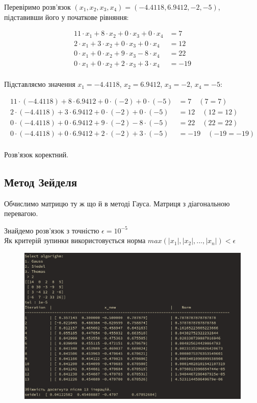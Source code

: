 \documentclass[a4paper, 12pt]{article}
\begin{document}
Перевіримо розв'язок \((x_1, x_2, x_3, x_4) = (-4.4118, 6.9412, -2, -5)\), підставивши його у початкове рівняння:

\[
\begin{aligned}
    11 \cdot x_1 + 8 \cdot x_2 + 0 \cdot x_3 + 0 \cdot x_4 &= 7 \\
    2 \cdot x_1 + 3 \cdot x_2 + 0 \cdot x_3 + 0 \cdot x_4 &= 12 \\
    0 \cdot x_1 + 0 \cdot x_2 + 9 \cdot x_3 - 8 \cdot x_4 &= 22 \\
    0 \cdot x_1 + 0 \cdot x_2 + 2 \cdot x_3 + 3 \cdot x_4 &= -19 \\
\end{aligned}
\]

Підставляємо значення \(x_1 = -4.4118\), \(x_2 = 6.9412\), \(x_3 = -2\), \(x_4 = -5\):

\[
\begin{aligned}
    11 \cdot (-4.4118) + 8 \cdot 6.9412 + 0 \cdot (-2) + 0 \cdot (-5) &= 7 \quad (7 = 7) \\
    2 \cdot (-4.4118) + 3 \cdot 6.9412 + 0 \cdot (-2) + 0 \cdot (-5) &= 12 \quad (12 = 12) \\
    0 \cdot (-4.4118) + 0 \cdot 6.9412 + 9 \cdot (-2) - 8 \cdot (-5) &= 22 \quad (22 = 22) \\
    0 \cdot (-4.4118) + 0 \cdot 6.9412 + 2 \cdot (-2) + 3 \cdot (-5) &= -19 \quad (-19 = -19) \\
\end{aligned}
\]

Розв'язок коректний.

\newpage
\subsection{Метод Зейделя}

Обчислимо матрицю ту ж що й в методі Гауса.
Матриця з діагональною перевагою.

Знайдемо розв'язок з точністю $\epsilon = 10^{-5}$ \\
Як критерій зупинки використовується норма $max(|x_1|, |x_2|, ..., |x_n|) < \epsilon$ \\ 

\begin{figure}[h]
	\centering
	\includegraphics[width=0.8\linewidth]{seidel_result.png}
\end{figure}
\end{document}
